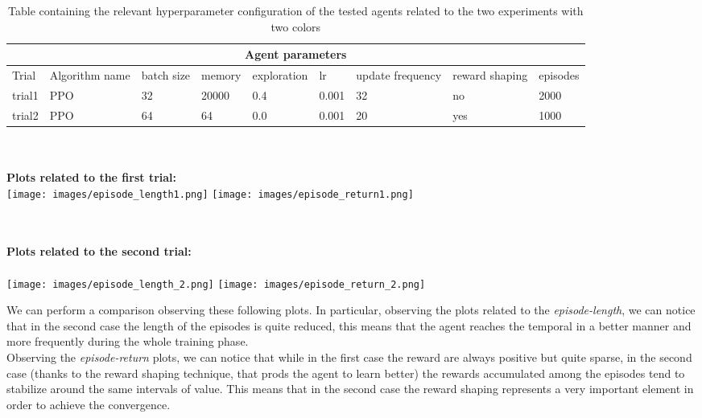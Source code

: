 \documentclass{article}
\begin{document}
\begin{table}[h]
\begin{tabular}{|p{1cm} |p{2cm}||p{1cm}|p{1.5cm}|p{2cm}|p{1cm}|p{1cm}|p{1cm}|p{1.1cm}|  }
 \hline
 \multicolumn{9}{|c|}{Agent parameters} \\
 \hline
Trial & Algorithm name & batch size & memory & exploration & lr & update frequency &reward shaping & episodes \\
 \hline
trial1& PPO & 32 & 20000 & 0.4 & 0.001 & 32 & no & 2000 \\
\hline
\hline
trial2& PPO & 64 & 64 & 0.0 & 0.001 & 20&  yes &1000 \\
\hline
\end{tabular}
\caption{Table containing the relevant hyperparameter configuration of the tested agents related to the two experiments with two colors}
\end{table}

\noindent\\ \\
\textbf{Plots related to the first trial:}\\
\texttt{[image: images/episode\_length1.png]}
\texttt{[image: images/episode\_return1.png]}



\noindent\\ \\
\textbf{Plots related to the second trial:}\\\\
\texttt{[image: images/episode\_length\_2.png]}
\texttt{[image: images/episode\_return\_2.png]}

\noindent
We can perform a comparison observing these following plots.
In particular, observing the plots related to the \textit{episode-length}, we can notice that in the second case the length of the episodes is quite reduced, this means that the agent reaches the temporal in a better manner and more frequently during the whole training phase.\\
Observing the \textit{episode-return} plots, we can notice that while in the first case the reward are always positive but quite sparse, in the second case (thanks to the reward shaping technique, that prods the agent to learn better) the rewards accumulated among the episodes tend to  stabilize around the same intervals of value. This means that in the second case the reward shaping represents a very important element in order to achieve the convergence. 
\end{document}
